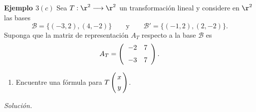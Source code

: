 \subsection{}
%
\begin{frame}%
	
	\begin{ej}{\textbf{Ejemplo $3(c)$ }}
		Sea $T:\r^2\longrightarrow\r^2$ un transformación lineal y considere en $\r^2$ las bases
		\[
		\mathcal{B}=\{(-3,2), (4,-2)\} \qquad \text{y} \qquad \mathcal{B}'=\{(-1,2), (2,-2)\}. 
		\]
		Suponga que la matriz de representación $A_T$ respecto a la base 
		$\mathcal{B}$ es 
		\[
		A_T = 
		\left( 
		\begin{array}{@{\hspace{1\tabcolsep}}rr}	
		-2 & 7 \\[2mm] 
		-3 & 7
		\end{array} 
		\right).
		\]
		
		\vspace{-2mm}
		\begin{enumerate}[$c$]
			\justifying
			\item Encuentre una fórmula para $T\left(
			\begin{array}{@{\hspace{0.3\tabcolsep}}c@{\hspace{0.3\tabcolsep}}}
			x  \\[1mm]
			y  
			\end{array}
			\right)$.
		\end{enumerate}
	\end{ej}
	\textit{Solución.}
	
\end{frame}

